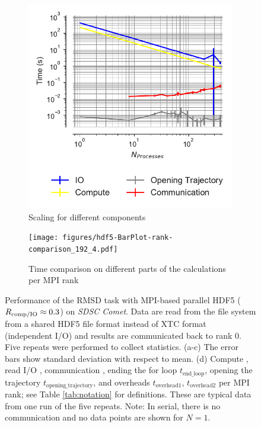 \begin{figure}[!htb]
  \begin{subfigure}{.49\textwidth}
    \centering
    \includegraphics[width=\linewidth]{figures/hdf5-time_comp_IO_comparison.pdf}
    \captionsetup{format=hang}
    \caption{Scaling for different components}
    \label{fig:ScalingComputeIO-hdf5}
  \end{subfigure}
  \hfill
  \begin{subfigure} {.5\textwidth}
    \texttt{[image: figures/hdf5-BarPlot-rank-comparison\_192\_4.pdf]}
    \captionsetup{format=hang}
    \caption{Time comparison on different parts of the calculations per MPI rank}
    \label{fig:MPIranks-hdf5}
  \end{subfigure}
  \caption{Performance of the RMSD task with MPI-based parallel HDF5 ($R_{\text{comp/IO}} \approx 0.3$) on \emph{SDSC Comet}.
    Data are read from the file system from a shared HDF5 file format instead of XTC format (independent I/O) and results are communicated back to rank 0. 
    Five repeats were performed to collect statistics.
    (a-c) The error bars show standard deviation with respect to mean.
    (d) Compute \tcomp, read I/O \tIO, communication \tcomm, ending the for loop $t_{\text{end\_loop}}$,
    opening the trajectory $t_{\text{opening\_trajectory}}$, and overheads $t_{\text{overhead1}}$, $t_{\text{overhead2}}$ per MPI rank; see Table \ref{tab:notation} for definitions.
    These are typical data from one run of the five repeats.
    Note: In serial, there is no communication and no data points are shown for $N=1$.}
  \label{fig:MPIwithIO-hdf5}
\end{figure}

